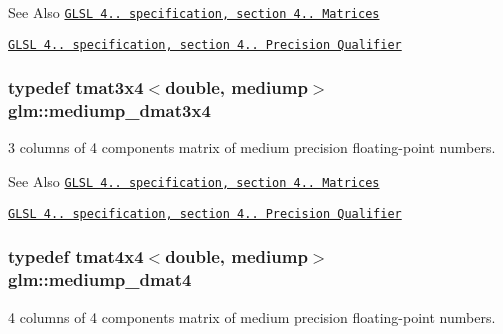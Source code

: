\begin{DoxySeeAlso}{See Also}
\href{http://www.opengl.org/registry/doc/GLSLangSpec.4.20.8.pdf}{\tt G\-L\-S\-L 4.. specification, section 4.. Matrices} 

\href{http://www.opengl.org/registry/doc/GLSLangSpec.4.20.8.pdf}{\tt G\-L\-S\-L 4.. specification, section 4.. Precision Qualifier} 
\end{DoxySeeAlso}
\hypertarget{group__core__precision_ga38bf4080b5b7d9ecc1fdbe2932511e4b}{
\subsubsection[{mediump\-\_\-dmat3x4}]{\setlength{\rightskip}{0pt plus 5cm}typedef tmat3x4$<$double, mediump$>$ {\bf glm\-::mediump\-\_\-dmat3x4}}}\label{group__core__precision_ga38bf4080b5b7d9ecc1fdbe2932511e4b}
3 columns of 4 components matrix of medium precision floating-\/point numbers.

\begin{DoxySeeAlso}{See Also}
\href{http://www.opengl.org/registry/doc/GLSLangSpec.4.20.8.pdf}{\tt G\-L\-S\-L 4.. specification, section 4.. Matrices} 

\href{http://www.opengl.org/registry/doc/GLSLangSpec.4.20.8.pdf}{\tt G\-L\-S\-L 4.. specification, section 4.. Precision Qualifier} 
\end{DoxySeeAlso}
\hypertarget{group__core__precision_ga434a0c62564f19f260ed0520995e90f3}{
\subsubsection[{mediump\-\_\-dmat4}]{\setlength{\rightskip}{0pt plus 5cm}typedef tmat4x4$<$double, mediump$>$ {\bf glm\-::mediump\-\_\-dmat4}}}\label{group__core__precision_ga434a0c62564f19f260ed0520995e90f3}
4 columns of 4 components matrix of medium precision floating-\/point numbers.

